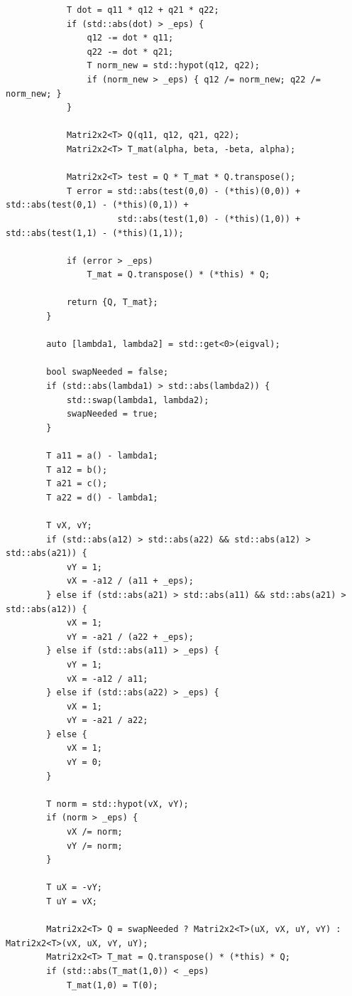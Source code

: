 \documentclass[11pt]{article}
\begin{document}
\begin{lstlisting}
            T dot = q11 * q12 + q21 * q22;
            if (std::abs(dot) > _eps) {
                q12 -= dot * q11;
                q22 -= dot * q21;
                T norm_new = std::hypot(q12, q22);
                if (norm_new > _eps) { q12 /= norm_new; q22 /= norm_new; }
            }
            
            Matri2x2<T> Q(q11, q12, q21, q22);
            Matri2x2<T> T_mat(alpha, beta, -beta, alpha);
            
            Matri2x2<T> test = Q * T_mat * Q.transpose();
            T error = std::abs(test(0,0) - (*this)(0,0)) + std::abs(test(0,1) - (*this)(0,1)) +
                      std::abs(test(1,0) - (*this)(1,0)) + std::abs(test(1,1) - (*this)(1,1));
            
            if (error > _eps)
                T_mat = Q.transpose() * (*this) * Q;
            
            return {Q, T_mat};
        }
        
        auto [lambda1, lambda2] = std::get<0>(eigval);
        
        bool swapNeeded = false;
        if (std::abs(lambda1) > std::abs(lambda2)) {
            std::swap(lambda1, lambda2);
            swapNeeded = true;
        }
        
        T a11 = a() - lambda1;
        T a12 = b();
        T a21 = c();
        T a22 = d() - lambda1;
        
        T vX, vY;
        if (std::abs(a12) > std::abs(a22) && std::abs(a12) > std::abs(a21)) {
            vY = 1;
            vX = -a12 / (a11 + _eps);
        } else if (std::abs(a21) > std::abs(a11) && std::abs(a21) > std::abs(a12)) {
            vX = 1;
            vY = -a21 / (a22 + _eps);
        } else if (std::abs(a11) > _eps) {
            vY = 1;
            vX = -a12 / a11;
        } else if (std::abs(a22) > _eps) {
            vX = 1;
            vY = -a21 / a22;
        } else {
            vX = 1;
            vY = 0;
        }
        
        T norm = std::hypot(vX, vY);
        if (norm > _eps) {
            vX /= norm;
            vY /= norm;
        }
        
        T uX = -vY;
        T uY = vX;
        
        Matri2x2<T> Q = swapNeeded ? Matri2x2<T>(uX, vX, uY, vY) : Matri2x2<T>(vX, uX, vY, uY);
        Matri2x2<T> T_mat = Q.transpose() * (*this) * Q;
        if (std::abs(T_mat(1,0)) < _eps)
            T_mat(1,0) = T(0);
        

\end{lstlisting}
\end{document}
